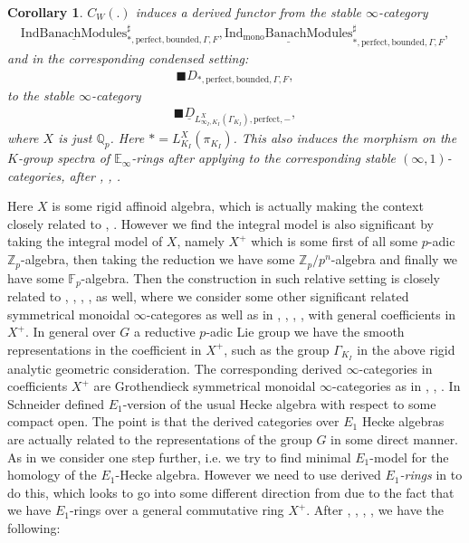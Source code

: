 \documentclass[12pt]{article}
\newtheorem{corollary}{Corollary}
\theoremstyle{definition}
\begin{document}
\begin{corollary}
$C_{W}(.)$ induces a derived functor from the stable $\infty$-category 
\begin{align}
\underline{\mathrm{IndBanachModules}}^\sharp_{*,\mathrm{perfect},\mathrm{bounded},\Gamma,F}, \underline{\mathrm{Ind_{\mathrm{mono}}BanachModules}}^\sharp_{*,\mathrm{perfect},\mathrm{bounded},\Gamma,F},
\end{align}
and in the corresponding condensed setting:
\begin{align}
\blacksquare D_{*,\mathrm{perfect},\mathrm{bounded},\Gamma,F},
\end{align}
to the stable $\infty$-category 
\begin{align}
\blacksquare\underline{D}_{L^X_{\infty_I,K_I}(\Gamma_{K_I}),\mathrm{perfect},-},
\end{align}
where $X$ is just $\mathbb{Q}_p$. Here $*=L_{K_I}^X(\pi_{K_I})$. This also induces the morphism on the $K$-group spectra of $\mathbb{E}_\infty$-rings after applying \cite{BGT} to the corresponding stable $(\infty,1)$-categories, after \cite{G2}, \cite{A2}, \cite{BGT}.
\end{corollary}



\indent Here $X$ is some rigid affinoid algebra, which is actually making the context closely related to \cite{Z1}, \cite{ST}. However we find the integral model is also significant by taking the integral model of $X$, namely $X^+$ which is some first of all some $p$-adic $\mathbb{Z}_p$-algebra, then taking the reduction we have some $\mathbb{Z}_p/p^n$-algebra and finally we have some $\mathbb{F}_p$-algebra. Then the construction in such relative setting is closely related to \cite{Sc1}, \cite{So1}, \cite{SS1}, \cite{SS2}, \cite{HM} as well, where we consider some other significant related symmetrical monoidal $\infty$-categores as well as in \cite{Sc1}, \cite{So1}, \cite{SS1}, \cite{SS2}, \cite{HM} with general coefficients in $X^+$. In general over $G$ a reductive $p$-adic Lie group we have the smooth representations in the coefficient in $X^+$, such as the group $\Gamma_{K_I}$ in the above rigid analytic geometric consideration. The corresponding derived $\infty$-categories in coefficients $X^+$ are  Grothendieck symmetrical monoidal $\infty$-categories as in \cite{SS1}, \cite{SS2}, \cite{HM}. In \cite{Sc1} Schneider defined $E_1$-version of the usual Hecke algebra with respect to some compact open. The point is that the derived categories over $E_1$ Hecke algebras are actually related to the representations of the group $G$ in some direct manner. As in \cite{So1} we consider one step further, i.e. we try to find minimal $E_1$-model for the homology of the $E_1$-Hecke algebra. However we need to use derived \textit{$E_1$-rings} in \cite{Sa} to do this, which looks to go into some different direction from \cite{So1} due to the fact that we have $E_1$-rings over a general commutative ring $X^+$. After \cite{Sc1}, \cite{So1}, \cite{SS1}, \cite{SS2}, \cite{HM} we have the following:
\end{document}
